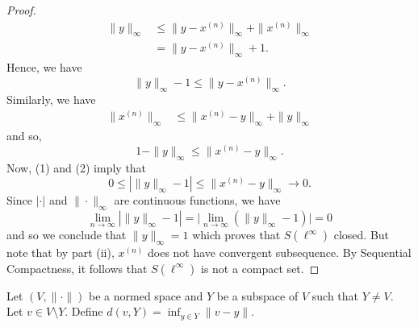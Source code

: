 \documentclass[a4paper]{article}
\begin{document}
\begin{enumerate}
\begin{proof}
\begin{align*}
                \|y\|_{\infty } &\leq \|y - x^{(n)}\|_{\infty} + \|x^{(n)}\|_{\infty }  \\
                                &= \|y - x^{(n)}\|_{\infty } + 1.
        \end{align*} 
        Hence, we have 
        \[  \|y\|_{\infty } - 1 \leq \|y - x^{(n)}\|_{\infty }. \tag{1}\]
        Similarly, we have 
        \begin{align*}
            \|x^{(n)}\|_{\infty } &\leq \| x^{(n)} - y \|_{\infty } + \|y\|_{\infty }
        \end{align*}
        and so, 
        \[  1 - \|y\|_{\infty } \leq \|x^{(n)} - y \|_{\infty }. \tag{2} \]
        Now, (1) and (2) imply that 
        \[  0 \leq | \|y\|_{\infty } - 1 | \leq \|x^{(n)} - y\|_{\infty } \to 0.  \]
        Since \( | \cdot |  \) and \( \|\cdot\|_{\infty } \) are continuous functions, we have 
        \[  \lim_{ n \to \infty  }  | \|y\|_{\infty } - 1 | = \Big| \lim_{ n \to \infty  } (\|y\|_{\infty } - 1)   \Big| =   0   \]
        and so we conclude that \( \|y\|_{\infty} = 1 \) which proves that \( S(\ell^{\infty }) \) closed. But note that by part (ii), \( x^{(n)} \) does not have convergent subsequence. By Sequential Compactness, it follows that \( S(\ell^{\infty}) \) is not a compact set.  
        \end{proof}
\end{enumerate}

\begin{problem}
    Let \( (V,\|\cdot\|)  \) be a normed space and \( Y  \) be a subspace of \( V  \) such that \( Y \neq V  \). Let \( v \in V \setminus  Y  \). Define \( d(v,Y) = \inf_{y \in Y } \|v-y\| \).
\end{problem}
\end{document}
